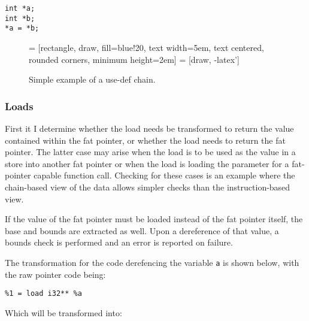 \begin{verbatim}
int *a;
int *b;
*a = *b;
\end{verbatim}
\begin{figure}
\centering
{} = [rectangle, draw, fill=blue!20, 
    text width=5em, text centered, rounded corners, minimum height=2em]
 = [draw, -latex']
\caption{Simple example of a use-def chain.}
\label{fig:UseDef}
\end{figure}

\subsubsection{Loads}

First it I determine whether the load needs be transformed to return the value contained within the fat pointer, or whether the load needs to return the fat pointer.
The latter case may arise when the load is to be used as the value in a store into another fat pointer or when the load is loading the parameter for a fat-pointer capable function call.
Checking for these cases is an example where the chain-based view of the data allows simpler checks than the instruction-based view.

If the value of the fat pointer must be loaded instead of the fat pointer itself, the base and bounds are extracted as well.
Upon a dereference of that value, a bounds check is performed and an error is reported on failure.

The transformation for the code derefencing the variable \verb!a! is shown below, with the raw pointer code being:

\begin{verbatim}
%1 = load i32** %a
\end{verbatim}

Which will be transformed into:

